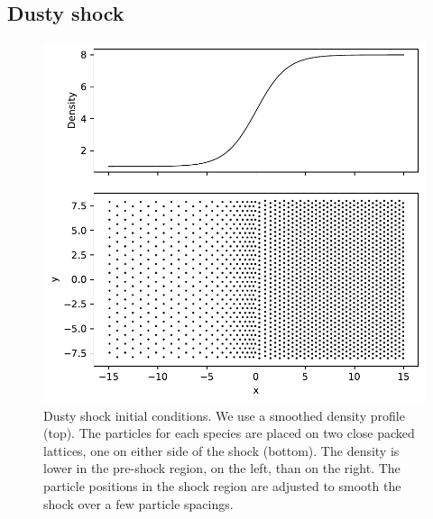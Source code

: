\documentclass[fleqn,usenatbib]{mnras}
\begin{document}
\subsection{Dusty shock}%
\label{subsec:shock}

\begin{figure}
   \begin{center}
      \includegraphics[width=\columnwidth]{figs/dustyshock_initial.pdf}
      \caption{Dusty shock initial conditions. We use a smoothed density profile
         (top). The particles for each species are placed on two close packed
         lattices, one on either side of the shock (bottom). The density is
         lower in the pre-shock region, on the left, than on the right. The
         particle positions in the shock region are adjusted to smooth the shock
         over a few particle spacings.%
         \label{fig:dustyshock_initial}}
   \end{center}
\end{figure}
\end{document}
